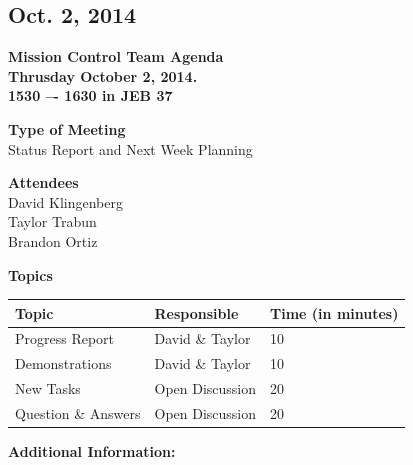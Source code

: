 \documentclass[pdftex,11pt]{article}
\begin{document}
\clearpage

\subsection{Oct. 2, 2014}
{ \huge \bfseries Mission Control Team Agenda \\[0.4cm] }
{ \huge \bfseries Thrusday October 2, 2014.\\1530 –-  1630  in JEB 37\\[0.4cm] }
\vspace*{2.5mm}

{ \large \bfseries \hspace*{2 mm} Type of Meeting\\}
\hspace*{12 mm}  Status Report and  Next Week Planning
\vspace*{1.5mm}

{ \large \bfseries \hspace*{2 mm} Attendees\\}
\hspace*{12mm} David Klingenberg\\
\hspace*{12mm} Taylor Trabun\\
\hspace*{12mm} Brandon Ortiz\\
\vspace*{1.5mm}

{ \large \bfseries \noindent Topics}
\vspace*{2.5mm}

\begin{tabular}{| l | l | l |}
  \hline
  \bfseries Topic & \bfseries Responsible & \bfseries Time (in minutes) \\ \hline
  Progress Report  & David \& Taylor &  10 \\ \hline
  Demonstrations & David \& Taylor & 10 \\ \hline
  New Tasks & Open Discussion & 20 \\ \hline
  Question \&  Answers  & Open Discussion & 20 \\ 
  \hline
\end{tabular}

\vspace*{2.5mm}
{ \large \bfseries \noindent Additional Information:}
\end{document}
